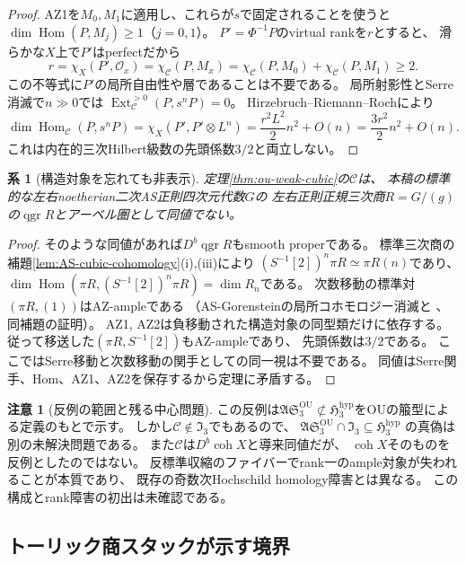 \documentclass[11pt,a4paper]{ltjsarticle}
\newtheorem{corollary}[theorem]{系}
\theoremstyle{definition}
\newtheorem{remark}[theorem]{注意}
\newcommand{\qgr}{\operatorname{qgr}}
\newcommand{\coh}{\operatorname{coh}}
\begin{document}
\begin{proof}
AZ1を$M_0,M_1$に適用し、これらが$s$で固定されることを使うと
$\dim\operatorname{Hom}(P,M_j)\geq1$（$j=0,1$）。
$P'=\Phi^{-1}P$のvirtual rankを$r$とすると、
滑らかな$X$上で$P'$はperfectだから
\[
 r=\chi_X(P',\mathcal O_x)=\chi_{\mathcal C}(P,M_x)
  =\chi_{\mathcal C}(P,M_0)+\chi_{\mathcal C}(P,M_1)\geq2.
\]
この不等式に$P'$の局所自由性や層であることは不要である。
局所射影性とSerre消滅で$n\gg0$では
$\operatorname{Ext}^{>0}_{\mathcal C}(P,s^nP)=0$。
Hirzebruch--Riemann--Rochにより
\[
 \dim\operatorname{Hom}_{\mathcal C}(P,s^nP)
 =\chi_X(P',P'\otimes L^n)
 =\frac{r^2L^2}{2}n^2+O(n)=\frac{3r^2}{2}n^2+O(n).
\]
これは内在的三次Hilbert級数の先頭係数$3/2$と両立しない。
\end{proof}

\begin{corollary}[構造対象を忘れても非表示]\label{cor:ou-weak-unpointed}
定理\ref{thm:ou-weak-cubic}の$\mathcal C$は、
本稿の標準的な左右noetherian二次AS正則四次元代数$G$の
左右正則正規三次商$R=G/(g)$の$\qgr R$とアーベル圏として同値でない。
\end{corollary}
\begin{proof}
そのような同値があれば$D^b\qgr R$もsmooth properである。
標準三次商の補題\ref{lem:AS-cubic-cohomology}(i),(iii)により
$(S^{-1}[2])^n\pi R\simeq\pi R(n)$であり、
$\dim\operatorname{Hom}(\pi R,(S^{-1}[2])^n\pi R)=\dim R_n$である。
次数移動の標準対$(\pi R,(1))$はAZ-ampleである
（AS-Gorensteinの局所コホモロジー消滅と
\cite{AZ1994,YZ1997}、同補題の証明）。
AZ1, AZ2は負移動された構造対象の同型類だけに依存する。
従って移送した$(\pi R,S^{-1}[2])$もAZ-ampleであり、
先頭係数は$3/2$である。
ここではSerre移動と次数移動の関手としての同一視は不要である。
同値はSerre関手、Hom、AZ1、AZ2を保存するから定理に矛盾する。
\end{proof}

\begin{remark}[反例の範囲と残る中心問題]\label{rem:ou-weak-scope}
この反例は$\mathfrak{AS}^{\mathrm{OU}}_3\not\subset
\mathfrak H^{\mathrm{hyp}}_3$をOUの箙型による定義のもとで示す。
しかし$\mathcal C\notin\mathfrak I_3$でもあるので、
$\mathfrak{AS}^{\mathrm{OU}}_3\cap\mathfrak I_3
 \subseteq\mathfrak H^{\mathrm{hyp}}_3$
の真偽は別の未解決問題である。
また$\mathcal C$は$D^b\coh X$と導来同値だが、
$\coh X$そのものを反例としたのではない。
反標準収縮のファイバーでrank一のample対象が失われることが本質であり、
既存の奇数次Hochschild homology障害とは異なる。
この構成とrank障害の初出は未確認である。
\end{remark}

\subsection{トーリック商スタックが示す境界}\label{subsec:stack-boundary}
\end{document}
